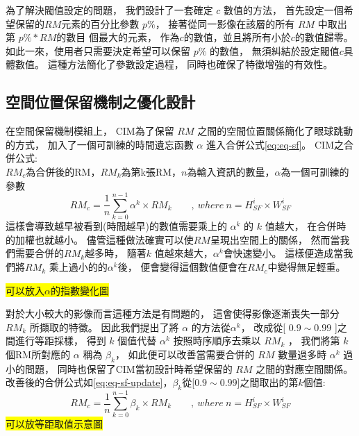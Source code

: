 \documentclass[class=NCU_thesis, crop=false]{standalone}
\begin{document}
	為了解決閥值設定的問題，
	我們設計了一套確定 $c$ 數值的方法，
	首先設定一個希望保留的$RM$元素的百分比參數 $p\%$，
	接著從同一影像在該層的所有 $RM$ 中取出第 $p\% * RM的數目$  個最大的元素，
	作為$c$的數值，並且將所有小於$c$的數值歸零。
	如此一來，使用者只需要決定希望可以保留 $p\%$ 的數值，
	無須糾結於設定閥值$c$具體數值。
	這種方法簡化了參數設定過程，
	同時也確保了特徵增強的有效性。


	\subsection{空間位置保留機制之優化設計}
	在空間保留機制模組上，
	CIM為了保留 $RM$ 之間的空間位置關係簡化了眼球跳動的方式，
	加入了一個可訓練的時間遺忘函數 $\alpha$ 進入合併公式\cref{eq:eq-sf}。
	CIM之合併公式:\\
		$RM_{c}$為合併後的RM，$RM_{k}$為第k張RM，$n$為輸入資訊的數量，$\alpha$為一個可訓練的參數
		\begin{equation}
		    \label{eq:eq-sf}
		    RM_{c}=\frac{1}{n} \sum_{k = 0}^{n-1} \alpha^{k} \times RM_{k}  \qquad ,\ where\ n = \textit{H}^{i}_{SF} \times \textit{W}^{i}_{SF}
		\end{equation}
	這樣會導致越早被看到(時間越早)的數值需要乘上的 $\alpha^{k}$ 的 $k$ 值越大，
	在合併時的加權也就越小。
	儘管這種做法確實可以使$RM$呈現出空間上的關係，
	然而當我們需要合併的$RM_{k}$越多時，
	隨著$k$ 值越來越大，$\alpha^{k}$會快速變小。
	這樣便造成當我們將$RM_{k}$ 乘上過小的的$\alpha^{k}$後，
	便會變得這個數值便會在$RM_{c}$中變得無足輕重。
	
	\colorbox {yellow}{可以放入$\alpha$的指數變化圖}

	對於大小較大的影像而言這種方法是有問題的，
	這會使得影像逐漸喪失一部分$ RM_{k} $ 所擷取的特徵。
	因此我們提出了將 $\alpha$ 的方法從$\alpha^{k}$，
	改成從[ $0.9 \sim 0.99$ ]之間進行等距採樣，
	得到 $k$ 個值代替 $\alpha^{k}$ 按照時序順序去乘以 $RM_{k}$ ，
	我們將第 $k$ 個RM所對應的 $\alpha$ 稱為 $\beta_{k}$，
	如此便可以改善當需要合併的 $RM$ 數量過多時 $\alpha^{k}$ 過小的問題，
	同時也保留了CIM當初設計時希望保留的 $RM$ 之間的對應空間關係。\\
	改善後的合併公式如\cref{eq:eq-sf-update}，$\beta_{k}$從[$0.9 \sim 0.99$]之間取出的第$k$個值:\\
		\begin{equation}
		    \label{eq:eq-sf-update}
		    RM_{c}=\frac{1}{n} \sum_{k = 0}^{n-1} \beta_{k} \times RM_{k}  \qquad ,\ where\ n = \textit{H}^{i}_{SF} \times \textit{W}^{i}_{SF}
		\end{equation}
	\colorbox {yellow}{可以放等距取值示意圖\cite{YangCNNInterpretable}}
\end{document}
